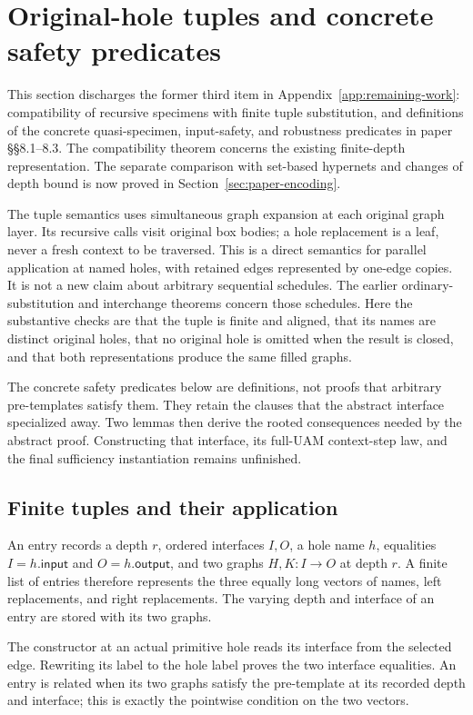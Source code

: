 \section{Original-hole tuples and concrete safety predicates}
\label{sec:tuple-safety}
This section discharges the former third item in
Appendix~\ref{app:remaining-work}: compatibility of recursive specimens with
finite tuple substitution, and definitions of the concrete quasi-specimen,
input-safety, and robustness predicates in paper \S\S8.1--8.3.
The compatibility theorem concerns the existing finite-depth representation.
The separate comparison with set-based hypernets and changes of depth bound
is now proved in Section~\ref{sec:paper-encoding}.

The tuple semantics uses simultaneous graph expansion at each original graph
layer. Its recursive calls visit original box bodies; a hole replacement is a
leaf, never a fresh context to be traversed. This is a direct semantics for
parallel application at named holes, with retained edges represented by
one-edge copies. It is not a new claim about arbitrary sequential schedules.
The earlier ordinary-substitution and interchange theorems concern those
schedules. Here the substantive checks are that the tuple is finite and
aligned, that its names are distinct original holes, that no original hole is
omitted when the result is closed, and that both representations produce the
same filled graphs.

The concrete safety predicates below are definitions, not proofs that arbitrary
pre-templates satisfy them. They retain the clauses that the abstract interface
specialized away. Two lemmas then derive the rooted consequences needed by the
abstract proof. Constructing that interface, its full-UAM context-step law,
and the final sufficiency instantiation remains unfinished.

\subsection{Finite tuples and their application}
\begin{definition}
An entry records a depth $r$, ordered interfaces $I,O$, a hole name $h$,
equalities $I=h.\mathsf{input}$ and $O=h.\mathsf{output}$, and two graphs
$H,K:I\to O$ at depth $r$. A finite list of entries therefore represents the
three equally long vectors of names, left replacements, and right replacements.
The varying depth and interface of an entry are stored with its two graphs.
\end{definition}
The constructor at an actual primitive hole reads its interface from the
selected edge. Rewriting its label to the hole label proves the two interface
equalities. An entry is related when its two graphs satisfy the pre-template
at its recorded depth and interface; this is exactly the pointwise condition
on the two vectors.

